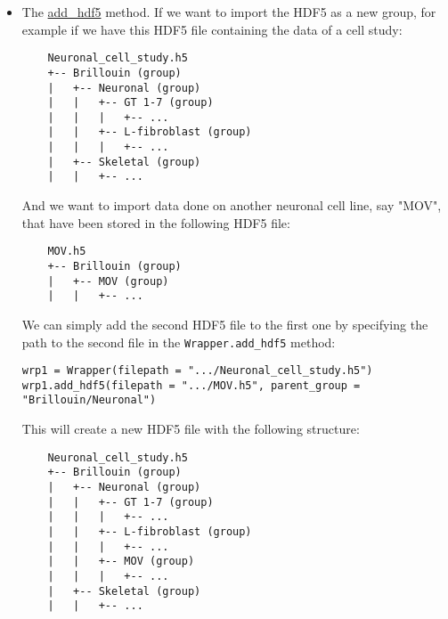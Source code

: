 \begin{itemize}
    \item The \hyperref[subchapter:wrapper.add_hdf5]{add\_hdf5} method. If we want to import the HDF5 as a new group, for example if we have this HDF5 file containing the data of a cell study:
    \begin{verbatim}
    Neuronal_cell_study.h5
    +-- Brillouin (group)
    |   +-- Neuronal (group)
    |   |   +-- GT 1-7 (group)
    |   |   |   +-- ...
    |   |   +-- L-fibroblast (group)
    |   |   |   +-- ...
    |   +-- Skeletal (group)
    |   |   +-- ...
    \end{verbatim}
    And we want to import data done on another neuronal cell line, say "MOV", that have been stored in the following HDF5 file:
    \begin{verbatim}
    MOV.h5
    +-- Brillouin (group)
    |   +-- MOV (group)
    |   |   +-- ...
    \end{verbatim}
    We can simply add the second HDF5 file to the first one by specifying the path to the second file in the \texttt{Wrapper.add\_hdf5} method:
\begin{lstlisting}
wrp1 = Wrapper(filepath = ".../Neuronal_cell_study.h5")
wrp1.add_hdf5(filepath = ".../MOV.h5", parent_group = "Brillouin/Neuronal")
\end{lstlisting}
    This will create a new HDF5 file with the following structure:
    \begin{verbatim}
    Neuronal_cell_study.h5
    +-- Brillouin (group)
    |   +-- Neuronal (group)
    |   |   +-- GT 1-7 (group)
    |   |   |   +-- ...
    |   |   +-- L-fibroblast (group)
    |   |   |   +-- ...
    |   |   +-- MOV (group)
    |   |   |   +-- ...
    |   +-- Skeletal (group)
    |   |   +-- ...
    \end{verbatim}
\end{itemize} 
